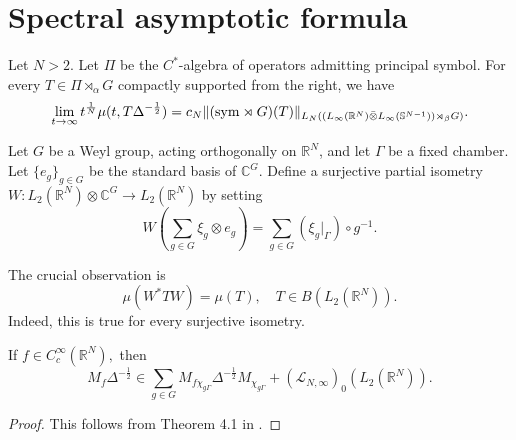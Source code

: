 \documentclass{amsart}
\begin{document}
\section{Spectral asymptotic formula}
\setcounter{equation}{0}



\begin{theorem}\label{crossed product asymptotics theorem} Let $N>2.$ Let $\Pi$ be the $C^{\ast}$-algebra of operators admitting principal symbol. For every $T\in\Pi\rtimes_{\alpha}G$ compactly supported from the right, we have
$$\lim_{t\to\infty}t^{\frac1N}\mu(t,T\Delta^{-\frac12})=c_N\|({\rm sym}\rtimes G)(T)\|_{L_N((L_{\infty}(\mathbb{R}^N)\bar{\otimes}L_{\infty}(\mathbb{S}^{N-1}))\rtimes_{\beta}G)}.$$
\end{theorem}

\begin{definition} Let $G$ be a Weyl group, acting orthogonally on $\mathbb{R}^N$, and let
$\Gamma$ be a fixed chamber. Let $\{e_g\}_{g\in G}$ be the standard basis of $\mathbb{C}^G.$ Define a surjective partial isometry $W:L_2(\mathbb{R}^N)\otimes\mathbb{C}^G
\longrightarrow L_2(\mathbb{R}^N)$ by setting
$$W\left(\sum_{g\in G}\xi_g\otimes e_g\right)=
\sum_{g\in G}(\xi_g|_\Gamma)\circ g^{-1}.$$
\end{definition}
The crucial observation is
$$\mu(W^{\ast}TW)=\mu(T),\quad
T\in B(L_2(\mathbb{R}^N)).$$
Indeed, this is true for every surjective isometry.

\begin{lemma}\label{first asymptotics lemma} If $f\in C^{\infty}_c(\mathbb{R}^N),$ then
$$M_f\Delta^{-\frac12}\in\sum_{g\in G}M_{f\chi_{g\Gamma}}\Delta^{-\frac12}M_{\chi_{g\Gamma}}+(\mathcal{L}_{N,\infty})_0(L_2(\mathbb{R}^N)).$$
\end{lemma}
\begin{proof} This follows from Theorem 4.1 in \cite{MR4549699}.
\end{proof}
\end{document}
